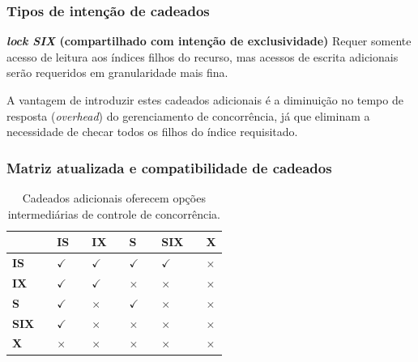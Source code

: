 \documentclass{beamer}
\begin{document}
\begin{frame}
    \frametitle{Tipos de intenção de cadeados}

    \begin{block}{\textbf{\emph{lock SIX} (compartilhado com intenção de exclusividade)}}
        Requer somente acesso de leitura aos índices filhos do recurso, mas acessos de escrita adicionais serão requeridos em granularidade mais fina. 
    \end{block}
    
    \medskip
    A vantagem de introduzir estes cadeados adicionais é a diminuição no tempo de resposta (\emph{overhead}) do gerenciamento de concorrência, já que eliminam a necessidade de checar todos os filhos do índice requisitado.
    
\end{frame}
    
    
\begin{frame}
    \frametitle{Matriz atualizada e compatibilidade de cadeados}

    \begin{table}
    \begin{tabular}{l l l l l l}
        \toprule

        \textbf{} && \textbf{IS} && \textbf{IX} && \textbf{S} && \textbf{SIX} && \textbf{X} \\

        \midrule

        \textbf{IS} && $\checkmark$ && $\checkmark$ && $\checkmark$ && $\checkmark$ && $\times$ \\
        \textbf{IX} && $\checkmark$ && $\checkmark$ && $\times$ && $\times$ && $\times$ \\
        \textbf{S} && $\checkmark$ && $\times$ && $\checkmark$ && $\times$ && $\times$ \\
        \textbf{SIX} && $\checkmark$ && $\times$ && $\times$ && $\times$ && $\times$ \\
        \textbf{X} && $\times$ && $\times$ && $\times$ && $\times$ && $\times$ \\

        \bottomrule
    \end{tabular}
    \caption{Cadeados adicionais oferecem opções intermediárias de controle de concorrência.}
    \end{table}
    
\end{frame}
\end{document}
